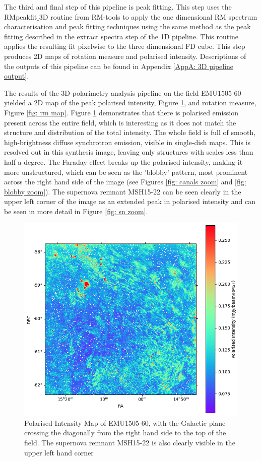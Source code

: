 The third and final step of this pipeline is peak fitting. 
This step uses the RMpeakfit$\_$3D routine from RM-tools to apply the one 
dimensional RM spectrum characterisation and peak fitting techniques using the same method as the peak fitting described in the extract spectra step of the 1D pipeline. This routine applies the resulting fit pixelwise to the three dimensional FD cube. This step produces 2D maps of rotation measure and polarised intensity. Descriptions of the outputs of this pipeline can be found in Appendix \ref{AppA: 3D pipeline output}.

The results of the 3D polarimetry analysis pipeline on the field EMU1505-60 yielded a 2D map of the peak polarised intensity, Figure \ref{fig: pi map}, and rotation measure, Figure \ref{fig: rm map}. Figure \ref{fig: pi map} demonstrates that there is polarised emission present across the entire field, which is interesting as it does not match the structure and distribution of the total intensity. The whole field is full of smooth, high-brightness diffuse synchrotron emission, visible in single-dish maps. This is resolved out in this synthesis image, leaving only structures with scales less than half a degree. The Faraday effect breaks up the polarised intensity, making it more unstructured, which can be seen as the 'blobby' pattern, most prominent across the right hand side of the image (see Figures \ref{fig: canals zoom} and \ref{fig: blobby zoom}). The supernova remnant MSH15-22 can be seen clearly in the upper left corner of the image as an extended peak in polarised intensity and can be seen in more detail in Figure \ref{fig: sn zoom}.

\begin{figure}
    \centering
    \includegraphics[width=1\linewidth]{Thesis_Template//Figures/Pi map.png}
    \caption[Polarised Intensity Map of EMU1505-60]{Polarised Intensity Map of EMU1505-60, with the Galactic plane crossing the diagonally from the right hand side to the top of the field. The supernova remnant MSH15-22 is also clearly visible in the upper left hand corner}
    \label{fig: pi map}
\end{figure}

